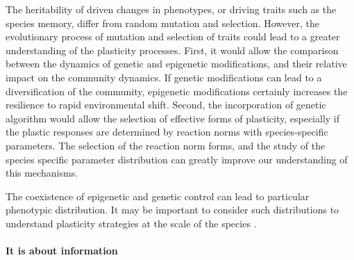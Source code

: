 The heritability of driven changes in phenotypes, or driving traits such as the species memory, differ from random mutation and selection. However, the evolutionary process of mutation and selection of traits could lead to a greater understanding of the plasticity processes. First, it would allow the comparison between the dynamics of genetic and epigenetic modifications, and their relative impact on the community dynamics. If genetic modifications can lead to a diversification of the community, epigenetic modifications certainly increases the resilience to rapid environmental shift. Second, the incorporation of genetic algorithm would allow the selection of effective forms of plasticity, especially if the plastic responses are determined by reaction norms with species-specific parameters. The selection of the reaction norm forms, and the study of the species specific parameter distribution can greatly improve our understanding of this mechanisms.

The coexistence of epigenetic and genetic control can lead to particular phenotypic distribution. It may be important to consider such distributions to understand plasticity strategies at the scale of the species \parencite{dewitt_expanding_2016}.



%
%

\paragraph{It is about information}


